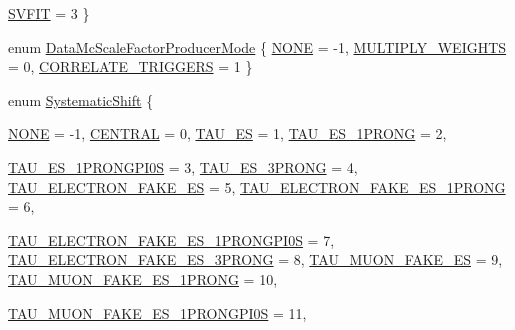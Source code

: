 \begin{DoxyCompactItemize}
\hyperlink{classHttEnumTypes_add21b4b1cefbea05ecb244d1b72f52e7ac5860cc57a15a8eca450926858ab40f8}{SVFIT} =  3
 \}
\item 
enum \hyperlink{classHttEnumTypes_a0185dcc829ec5820485e1742529a4435}{DataMcScaleFactorProducerMode} \{ \hyperlink{classHttEnumTypes_a6d52b15105995df93610454d88c598f0ae6a48243112654c40cd04a51396e999f}{NONE} =  -\/1, 
\hyperlink{classHttEnumTypes_a0185dcc829ec5820485e1742529a4435ad9385a17d738017361487be68056abdc}{MULTIPLY\_\-WEIGHTS} =  0, 
\hyperlink{classHttEnumTypes_a0185dcc829ec5820485e1742529a4435ab47d050cdd9e0ae73a64dc78b65c306c}{CORRELATE\_\-TRIGGERS} =  1
 \}
\item 
enum \hyperlink{classHttEnumTypes_a09f53466ade8cb436d340aedf88ab0c2}{SystematicShift} \{ \par
\hyperlink{classHttEnumTypes_a6d52b15105995df93610454d88c598f0ae6a48243112654c40cd04a51396e999f}{NONE} =  -\/1, 
\hyperlink{classHttEnumTypes_a09f53466ade8cb436d340aedf88ab0c2ad3776aeb1e5b13e7546617b54e5a10e2}{CENTRAL} =  0, 
\hyperlink{classHttEnumTypes_a09f53466ade8cb436d340aedf88ab0c2a3535af886bcd4cb8516db6a7e5348112}{TAU\_\-ES} =  1, 
\hyperlink{classHttEnumTypes_a09f53466ade8cb436d340aedf88ab0c2aba0975919a45e324c9f9f451688f100d}{TAU\_\-ES\_\-1PRONG} =  2, 
\par
\hyperlink{classHttEnumTypes_a09f53466ade8cb436d340aedf88ab0c2a99643db32e769b4703865d25d4f93616}{TAU\_\-ES\_\-1PRONGPI0S} =  3, 
\hyperlink{classHttEnumTypes_a09f53466ade8cb436d340aedf88ab0c2a5f21fad87d4c20430b536205c9b123aa}{TAU\_\-ES\_\-3PRONG} =  4, 
\hyperlink{classHttEnumTypes_a09f53466ade8cb436d340aedf88ab0c2a7b7c6d193200744e0650c9f0f2ce2cdc}{TAU\_\-ELECTRON\_\-FAKE\_\-ES} =  5, 
\hyperlink{classHttEnumTypes_a09f53466ade8cb436d340aedf88ab0c2ae47957002a9c06facd7fc748d0fafc7a}{TAU\_\-ELECTRON\_\-FAKE\_\-ES\_\-1PRONG} =  6, 
\par
\hyperlink{classHttEnumTypes_a09f53466ade8cb436d340aedf88ab0c2a271d7325b7f5b480a4f53fe00d269e07}{TAU\_\-ELECTRON\_\-FAKE\_\-ES\_\-1PRONGPI0S} =  7, 
\hyperlink{classHttEnumTypes_a09f53466ade8cb436d340aedf88ab0c2aa0ee8380da4994e9e4fc729bd2d320b6}{TAU\_\-ELECTRON\_\-FAKE\_\-ES\_\-3PRONG} =  8, 
\hyperlink{classHttEnumTypes_a09f53466ade8cb436d340aedf88ab0c2add60920dedea35fb6fa30818a6059041}{TAU\_\-MUON\_\-FAKE\_\-ES} =  9, 
\hyperlink{classHttEnumTypes_a09f53466ade8cb436d340aedf88ab0c2af0d4949ad62f8ad6211432e1685436b3}{TAU\_\-MUON\_\-FAKE\_\-ES\_\-1PRONG} =  10, 
\par
\hyperlink{classHttEnumTypes_a09f53466ade8cb436d340aedf88ab0c2ab70d6ce832206bf502410b28ad167010}{TAU\_\-MUON\_\-FAKE\_\-ES\_\-1PRONGPI0S} =  11, 

\end{DoxyCompactItemize}
